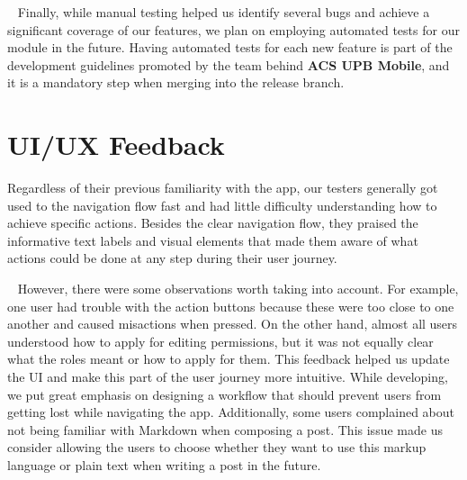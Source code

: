 ~
Finally, while manual testing helped us identify several bugs and achieve a significant coverage of our features, we plan on employing automated tests for our module in the future. Having automated tests for each new feature is part of the development guidelines promoted by the team behind \textbf{ACS UPB Mobile}, and it is a mandatory step when merging into the release branch.

\section{UI/UX Feedback}

Regardless of their previous familiarity with the app, our testers generally got used to the navigation flow fast and had little difficulty understanding how to achieve specific actions. Besides the clear navigation flow, they praised the informative text labels and visual elements that made them aware of what actions could be done at any step during their user journey.

~
However, there were some observations worth taking into account. For example, one user had trouble with the action buttons because these were too close to one another and caused misactions when pressed. On the other hand, almost all users understood how to apply for editing permissions, but it was not equally clear what the roles meant or how to apply for them. This feedback helped us update the UI and make this part of the user journey more intuitive. While developing, we put great emphasis on designing a workflow that should prevent users from getting lost while navigating the app. Additionally, some users complained about not being familiar with Markdown when composing a post. This issue made us consider allowing the users to choose whether they want to use this markup language or plain text when writing a post in the future.

